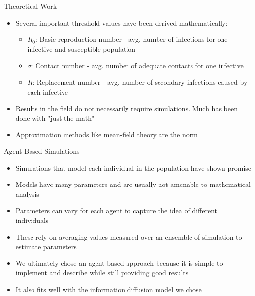 \documentclass{beamer}
\begin{document}
\begin{frame}{Theoretical Work}
    \begin{itemize}
        \item Several important threshold values have been derived mathematically:
        \begin{itemize}
            \item $R_{0}$: Basic reproduction number - avg. number of infections for one infective and susceptible population
            \item $\sigma$: Contact number - avg. number of adequate contacts for one infective
            \item $R$: Replacement number - avg. number of secondary infections caused by each infective
        \end{itemize}
        \item Results in the field do not necessarily require simulations. Much has been done with "just the math"
        \item Approximation methods like mean-field theory are the norm
    \end{itemize}
\end{frame}

\begin{frame}{Agent-Based Simulations}
    \begin{itemize}
        \item Simulations that model each individual in the population have shown promise
        \item Models have many parameters and are usually not amenable to mathematical analysis
        \item Parameters can vary for each agent to capture the idea of different individuals
        \item These rely on averaging values measured over an ensemble of simulation to estimate parameters
        \item We ultimately chose an agent-based approach because it is simple to implement and describe while still providing good results
        \item It also fits well with the information diffusion model we chose
    \end{itemize}
\end{frame}
\end{document}
